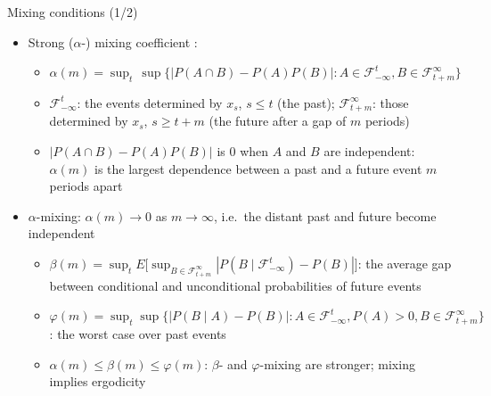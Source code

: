 \begin{frame}{Mixing conditions (1/2)}
\itemsize{\small}
\begin{itemize}
    \item Strong ($\alpha$-) mixing coefficient :
    \begin{itemize}
        \item $\alpha(m) = \sup_t\,\sup\{|P(A\cap B) - P(A)P(B)|: A \in \mathcal{F}_{-\infty}^{t}, B \in \mathcal{F}_{t+m}^{\infty}\}$
        \item $\mathcal{F}_{-\infty}^{t}$: the events determined by $x_s$, $s \le t$ (the past); $\mathcal{F}_{t+m}^{\infty}$: those determined by $x_s$, $s \ge t + m$ (the future after a gap of $m$ periods)
        \item $|P(A\cap B) - P(A)P(B)|$ is 0 when $A$ and $B$ are independent: $\alpha(m)$ is the largest dependence between a past and a future event $m$ periods apart
    \end{itemize}
    \item $\alpha$-mixing: $\alpha(m) \to 0$ as $m \to \infty$, i.e.\ the distant past and future become independent
    \begin{itemize}
        \item $\beta(m) = \sup_t E\big[\sup_{B \in \mathcal{F}_{t+m}^{\infty}}|P(B \mid \mathcal{F}_{-\infty}^{t}) - P(B)|\big]$: the average gap between conditional and unconditional probabilities of future events
        \item $\varphi(m) = \sup_t\sup\{|P(B \mid A) - P(B)|: A \in \mathcal{F}_{-\infty}^{t}, P(A) > 0, B \in \mathcal{F}_{t+m}^{\infty}\}$: the worst case over past events
        \item $\alpha(m) \le \beta(m) \le \varphi(m)$: $\beta$- and $\varphi$-mixing are stronger; mixing implies ergodicity 
    \end{itemize}
\end{itemize}
\end{frame}

